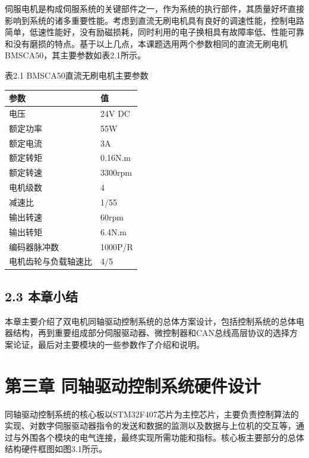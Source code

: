 \documentclass[UTF8,zihao=-4,openany,oneside]{ctexbook}
\begin{document}
伺服电机是构成伺服系统的关键部件之一，作为系统的执行部件，其质量好坏直接影响到系统的诸多重要性能。考虑到直流无刷电机具有良好的调速性能，控制电路简单，低速性能好，没有励磁损耗，同时利用的电子换相具有故障率低、性能可靠和没有磨损的特点。基于以上几点，本课题选用两个参数相同的直流无刷电机BMSCA50，其主要参数如表2.1所示。

\begin{center}表2.1 BMSCA50直流无刷电机主要参数\end{center}

\begin{table}[htbp]
\centering
{}
\renewcommand{\arraystretch}{1.25}
\begin{tabularx}{0.88\textwidth}{|>{\centering\arraybackslash}p{}|X|}
\hline
参数 & 值 \\
\hline
电压 & 24V DC \\
\hline
额定功率 & 55W \\
\hline
额定电流 & 3A \\
\hline
额定转矩 & 0.16N.m \\
\hline
额定转速 & 3300rpm \\
\hline
电机级数 & 4 \\
\hline
减速比 & 1/55 \\
\hline
输出转速 & 60rpm \\
\hline
输出转矩 & 6.4N.m \\
\hline
编码器脉冲数 & 1000P/R \\
\hline
电机齿轮与负载轴速比 & 4/5 \\
\hline
\end{tabularx}
\end{table}

\section{2.3 本章小结}

本章主要介绍了双电机同轴驱动控制系统的总体方案设计，包括控制系统的总体电器结构，再到重要组成部分伺服驱动器、微控制器和CAN总线高层协议的选择方案论证，最后对主要模块的一些参数作了介绍和说明。

\chapter{第三章 同轴驱动控制系统硬件设计}

同轴驱动控制系统的核心板以STM32F407芯片为主控芯片，主要负责控制算法的实现、对数字伺服驱动器指令的发送和数据的监测以及数据与上位机的交互等，通过与外围各个模块的电气连接，最终实现所需功能和指标。核心板主要部分的总体结构硬件框图如图3.1所示。
\end{document}

